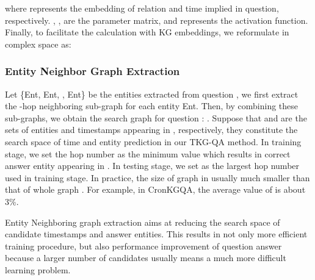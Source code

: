 \documentclass[11pt]{article}
\begin{document}
where  represents the embedding of relation and time implied in question, respectively. , ,  are the parameter matrix, and  represents the activation function. Finally, to facilitate the calculation with KG embeddings, we reformulate  in complex space as:








\subsubsection{Entity Neighbor Graph Extraction}


Let \{Ent, Ent, , Ent\} be the  entities extracted from question , we first extract the -hop neighboring sub-graph  for each entity Ent. Then, by combining these  sub-graphs, we obtain the search graph  for question : . Suppose that  and  are the sets of entities and timestamps appearing in , respectively, they constitute the search space of time and entity prediction in our TKG-QA method. In training stage, we set the hop number  as the minimum value which results in correct answer entity appearing in . In testing stage, we set  as the largest hop number used in training stage. In practice, the size of graph  in usually much smaller than that of whole graph . For example, in CronKGQA, 
the average value of  is about 3\%.

Entity Neighboring graph extraction aims at reducing the search space of candidate timestamps and answer entities.
This results in not only more efficient training procedure, but also performance improvement of question answer because a larger number of candidates usually means a much more difficult learning problem. 





 
\end{document}
